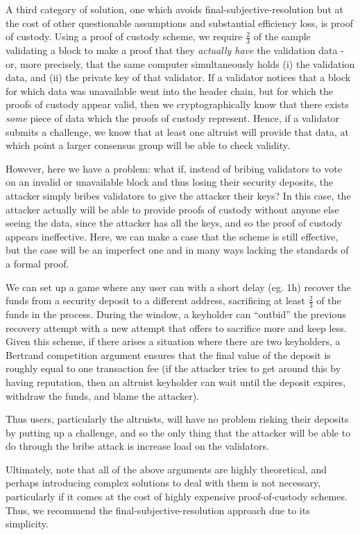 \documentclass[11pt,a4paper]{report}
\theoremstyle{plain}
\theoremstyle{definition}
\theoremstyle{remark}
\begin{document}
A third category of solution, one which avoids final-subjective-resolution but at the cost of other questionable assumptions and substantial efficiency loss, is proof of custody. Using a proof of custody scheme, we require $\frac{2}{3}$ of the sample validating a block to make a proof that they \emph{actually have} the validation data - or, more precisely, that the same computer simultaneously holds (i) the validation data, and (ii) the private key of that validator. If a validator notices that a block for which data was unavailable went into the header chain, but for which the proofs of custody appear valid, then we cryptographically know that there exists \emph{some} piece of data which the proofs of custody represent. Hence, if a validator submits a challenge, we know that at least one altruist will provide that data, at which point a larger consensus group will be able to check validity.

However, here we have a problem: what if, instead of bribing validators to vote on an invalid or unavailable block and thus losing their security deposits, the attacker simply bribes validators to give the attacker their keys? In this case, the attacker actually will be able to provide proofs of custody without anyone else seeing the data, since the attacker has all the keys, and so the proof of custody appears ineffective. Here, we can make a case that the scheme is still effective, but the case will be an imperfect one and in many ways lacking the standards of a formal proof.

We can set up a game where any user can with a short delay (eg. 1h) recover the funds from a security deposit to a different address, sacrificing at least $\frac{2}{3}$ of the funds in the process. During the window, a keyholder can ``outbid'' the previous recovery attempt with a new attempt that offers to sacrifice more and keep less. Given this scheme, if there arises a situation where there are two keyholders, a Bertrand competition argument ensures that the final value of the deposit is roughly equal to one transaction fee (if the attacker tries to get around this by having reputation, then an altruist keyholder can wait until the deposit expires, withdraw the funds, and blame the attacker).

Thus users, particularly the altruists, will have no problem risking their deposits by putting up a challenge, and so the only thing that the attacker will be able to do through the bribe attack is increase load on the validators.

Ultimately, note that all of the above arguments are highly theoretical, and perhaps introducing complex solutions to deal with them is not necessary, particularly if it comes at the cost of highly expensive proof-of-custody schemes. Thus, we recommend the final-subjective-resolution approach due to its simplicity.
\end{document}
